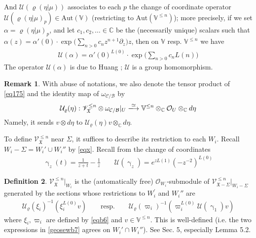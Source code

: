 \documentclass[11pt,b5paper,notitlepage]{article}
\theoremstyle{definition}
\newtheorem{df}{Definition}[subsection]
\newtheorem{rem}[df]{Remark}
\theoremstyle{plain}
\newcommand{\fk}{\mathfrak}
\newcommand{\mc}{\mathcal}
\newcommand{\SV}{\mathscr{V}}
\newcommand{\scr}{\mathscr}
\newcommand{\Vbb}{\mathbb V}
\newcommand{\Cbb}{\mathbb C}
\newcommand{\<}{\left\langle}
\renewcommand{\>}{\right\rangle}
\newcommand{\MO}{\mathcal{O}}
\newcommand{\MU}{\mathcal{U}}
\newcommand{\fx}{\mathfrak{X}}
\numberwithin{equation}{subsection}
\begin{document}
And $\mc U(\varrho(\eta|\mu))$ associates to each $p$ the change of coordinate operator $\mc U(\varrho(\eta|\mu)_p)\in\mathrm{Aut}(\Vbb)$ (restricting to $\mathrm{Aut}(\Vbb^{\leq n})$); more precisely, if we set $\alpha=\varrho(\eta|\mu)_p$, and let $c_1,c_2,\dots\in\Cbb$ be the (necessarily unique) scalars such that $\alpha(z)=\alpha'(0)\cdot\exp\Big(\sum_{n>0}c_nz^{n+1}\partial_z\Big)z$, then on $\Vbb$ resp. $\Vbb^{\leq n}$ we have
\begin{align}
\mc U(\alpha)=\alpha'(0)^{L(0)}\cdot\exp\Big(\sum_{n>0}c_nL(n)\Big)
\end{align}
The operator $\mc U(\alpha)$ is due to Huang \cite{Hua97}; $\mc U$ is a group homomorphism.

\begin{rem}
With abuse of notations, we also denote the tensor product of \eqref{eq175} and the identity map of $\omega_{\mc C/\mc B}$ by
\begin{align}\label{eqb43}
\mc U_\varrho(\eta):\scr V^{\leq n}_\fx\otimes \omega_{\mc C/\mc B}|_U\xlongrightarrow{\simeq}\Vbb^{\leq n}\otimes_\Cbb\mc O_U\otimes_\Cbb d\eta
\end{align}
Namely, it sends $v\otimes d\eta$ to $\mc U_\varrho(\eta)v\otimes_\Cbb d\eta$.
\end{rem}

To define $\scr V_{\fk X}^{\leq n}$ near $\Sigma$, it suffices to describe its restriction to each $W_i$. Recall $W_i-\Sigma=W_i'\cup W_i''$ by \eqref{eqx}. Recall from \cite[Sec. 1.3]{GZ1} the change of coordinates
\begin{gather}\label{eqb87}
\upgamma_z(t)=\frac 1{z+t}-\frac 1z\qquad \mc U(\upgamma_z)=e^{zL(1)}(-z^{-2})^{L(0)}
\end{gather}



\begin{df}\label{lbb45}
$\scr V_{\fk X}^{\leq n}|_{W_i}$ is the (automatically free) $\MO_{W_i}$-submodule of $\SV_{\fx-\Sigma}^{\leq n}\vert_{W_i-\Sigma}$ generated by the sections whose restrictions to $W_i^\prime$ and $W_i''$ are 
\begin{align}\label{geosewb7}
    \MU_\varrho(\xi_i)^{-1}(\xi_i^{L(0)}v) \qquad \text{resp.}\qquad \MU_\varrho(\varpi_i)^{-1}(\varpi_i^{L(0)}\MU(\upgamma_1)v)
\end{align}
where $\xi_i,\varpi_i$ are defined by \eqref{eqb6} and $v\in \Vbb^{\leq n}$. This is well-defined (i.e. the two expressions in \eqref{geosewb7} agrees on $W_i'\cap W_i''$). See \cite{Gui-sewingconvergence} Sec. 5, especially Lemma 5.2. 
\end{df}
\end{document}
